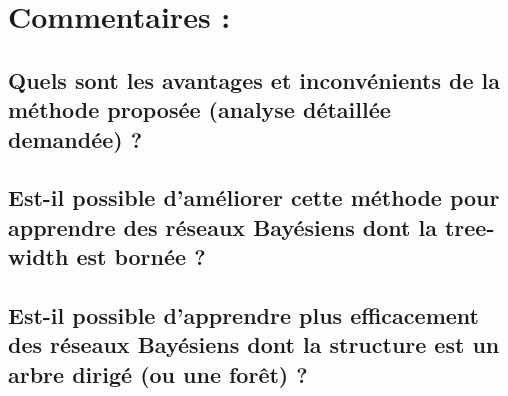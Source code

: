 \documentclass[french,a4paper]{article}
\begin{document}
\section{Commentaires :}
\subsection{Quels sont les avantages et inconvénients de la méthode proposée (analyse détaillée demandée) ?}
\subsection{Est-il possible d'améliorer cette méthode pour apprendre des réseaux Bayésiens dont la tree-width est bornée ?}
\subsection{Est-il possible d'apprendre plus efficacement des réseaux Bayésiens dont la structure est un arbre dirigé (ou une forêt) ?}
\end{document}
